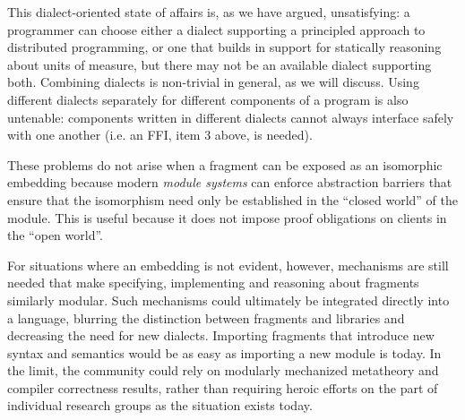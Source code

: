 This dialect-oriented state of affairs is, as we have argued, unsatisfying: a programmer can choose either a dialect supporting a principled approach to distributed programming, or one that builds in support for statically reasoning about units of measure, but there may not be an available dialect supporting both. Combining dialects is non-trivial in general, as we will discuss. Using different dialects separately for different components of a program is also untenable: components written in different dialects cannot always interface safely with one another (i.e. an FFI, item 3  above, is needed). 

These problems do not arise when a fragment can be exposed as an isomorphic embedding because modern \emph{module systems} can enforce abstraction barriers that ensure that the isomorphism need only be established in the ``closed world'' of the module. This is useful because it does not impose proof obligations on clients in the ``open world''.  %

For situations where an embedding is not evident, however, mechanisms are still needed that make specifying, implementing and reasoning about fragments similarly modular. Such mechanisms could ultimately be integrated directly into a language, blurring the distinction between fragments and libraries and decreasing the need for new dialects. Importing fragments that introduce new syntax and semantics   would be as easy as importing a new module is today. In the limit, the community could rely on modularly mechanized metatheory and compiler correctness results, rather than requiring heroic efforts on the part of individual research groups as the situation exists today. %

